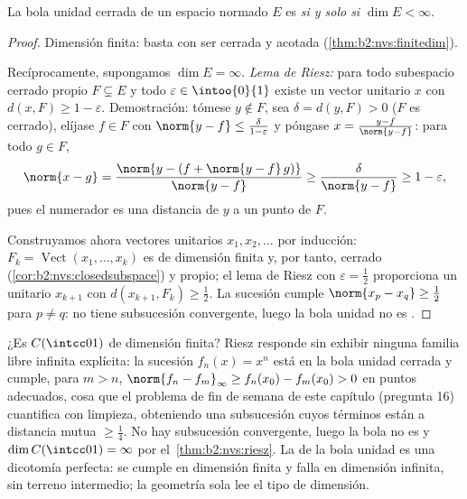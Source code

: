 \begin{theorem}[Riesz]\label{thm:b2:nvs:riesz}
La bola unidad cerrada de un espacio normado $E$ es 
\emph{si y solo si} $\dim E < \infty$.
\end{theorem}

\begin{proof}
Dimensión finita: basta con ser cerrada y acotada
(\cref{thm:b2:nvs:finitedim}).

Recíprocamente, supongamos $\dim E = \infty$. \emph{Lema de Riesz:}
para todo subespacio cerrado propio $F \subsetneq E$ y todo
$\varepsilon \in \intoo{0}{1}$ existe un vector unitario $x$ con
$d(x, F) \geq 1 - \varepsilon$. Demostración: tómese $y \notin F$,
sea $\delta = d(y, F) > 0$ ($F$ es cerrado), elíjase $f \in F$ con
$\norm{y - f} \leq \frac{\delta}{1 - \varepsilon}$ y póngase $x =
\frac{y - f}{\norm{y - f}}$: para todo $g \in F$,
\[
\norm{x - g} = \frac{\norm{y - (f + \norm{y-f}\,g)}}{\norm{y - f}}
\geq \frac{\delta}{\norm{y-f}} \geq 1 - \varepsilon ,
\]
pues el numerador es una distancia de $y$ a un punto de $F$.

Construyamos ahora vectores unitarios $x_1, x_2, \dots$ por
inducción: $F_k = \operatorname{Vect}(x_1, \dots, x_k)$ es de
dimensión finita y, por tanto, cerrado
(\cref{cor:b2:nvs:closedsubspace}) y propio; el lema de Riesz con
$\varepsilon = \frac12$ proporciona un unitario $x_{k+1}$ con
$d(x_{k+1}, F_k) \geq \frac12$. La sucesión cumple $\norm{x_p -
x_q} \geq \frac12$ para $p \neq q$: no tiene subsucesión
convergente, luego la bola unidad no es .
\end{proof}

\begin{example}\label{ex:b2:nvs:rieszdetector}
¿Es $C(\intcc01)$ de dimensión finita? Riesz responde sin exhibir
ninguna familia libre infinita explícita: la sucesión $f_n(x) =
x^n$ está en la bola unidad cerrada y cumple, para $m > n$,
$\norm{f_n - f_m}_\infty \geq f_n(x_0) - f_m(x_0) > 0$ en puntos
adecuados, cosa que el problema de fin de semana de este capítulo
(pregunta 16) cuantifica con limpieza, obteniendo una subsucesión
cuyos términos están a distancia mutua $\geq \frac14$. No hay
subsucesión convergente, luego la bola no es  y $\dim
C(\intcc01) = \infty$ por el~\cref{thm:b2:nvs:riesz}. La
 de la bola unidad es una dicotomía perfecta: se cumple
en dimensión finita y falla en dimensión infinita, sin terreno
intermedio; la geometría sola lee el tipo de dimensión.
\end{example}

